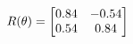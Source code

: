 \documentclass[preview]{standalone}
\begin{document}
\begin{align*}
\special{dvisvgm:raw <g id='unique000'>}R(\theta) = \begin{bmatrix}0.84 & -0.54\\0.54 & 0.84\end{bmatrix}\special{dvisvgm:raw </g>}
\end{align*}
\end{document}
